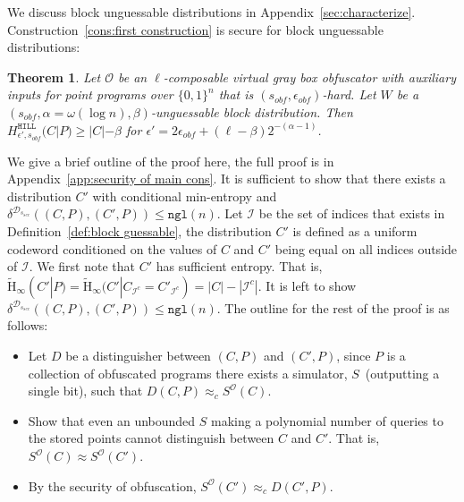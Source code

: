 \documentclass[11pt]{article}
\newcommand{\apref}[1]{\mbox{Appendix~\ref{#1}}}
\newcommand{\defref}[1]{\mbox{Definition~\ref{#1}}}
\newcommand{\consref}[1]{\mbox{Construction~\ref{#1}}}
\newcommand{\zo}{\ensuremath{\{0, 1\}}}
\newcommand{\hill}{\ensuremath{\mathtt{HILL}}\xspace}
\newcommand{\ngl}{\ensuremath{\mathtt{ngl}}\xspace}
\newcommand{\Hav}{\tilde{\mathrm{H}}_\infty}
\newtheorem{theorem}{Theorem}[section]
\begin{document}
We discuss  block unguessable distributions in \apref{sec:characterize}.  \consref{cons:first construction} is secure for block unguessable distributions:
\begin{theorem}
\label{thm:security of cons}
Let $\mathcal{O}$ be an $\ell$-composable virtual gray box obfuscator with auxiliary inputs for point programs over $\zo^n$ that is $(s_{obf}, \epsilon_{obf})$-hard.  Let $W$ be a $(s_{obf}, \alpha = \omega(\log n), \beta)$-unguessable block distribution.  Then $H^{\hill}_{\epsilon', s_{obf}}( C | P ) \geq |C| - \beta$ for $\epsilon' = 2\epsilon_{obf} + (\ell-\beta)2^{-(\alpha - 1)}$.
\end{theorem}

We give a brief outline of the proof here, the full proof is in \apref{app:security of main cons}.
It is sufficient to show that there exists a distribution $C'$ with conditional min-entropy and $\delta^{\mathcal{D}_{s_{sec}}}((C, P), (C', P))\le \ngl(n)$.  Let $\mathcal{I}$ be the set of indices that exists in \defref{def:block guessable}, the distribution $C'$ is defined as a uniform codeword conditioned on the values of $C$ and $C'$ being equal on all indices outside of $\mathcal{I}$.  We first note that $C'$ has sufficient entropy.  That is, $\Hav(C' |P) =\Hav(C' | C_{\mathcal{I}^c} = C'_{\mathcal{I}^c}) = |C| - |\mathcal{I}^c|$.  It is left to show $\delta^{\mathcal{D}_{s_{sec}}}((C, P), (C', P)) \le \ngl(n)$.
The outline for the rest of the proof is as follows:
\begin{itemize}
\item Let $D$ be a distinguisher between $(C, P)$ and $(C', P)$, since $P$ is a collection of obfuscated programs there exists a simulator, $S$~(outputting a single bit), such that $D(C, P) \approx_c S^{\mathcal{O}}(C)$.
\item Show that even an unbounded $S$ making a polynomial number of queries to the stored points cannot distinguish between $C$ and $C'$.  That is, $S^{\mathcal{O}}(C) \approx S^{\mathcal{O}}(C')$. 
\item By the security of obfuscation, $S^{\mathcal{O}}(C') \approx_c D(C', P)$.
\end{itemize}
\end{document}
